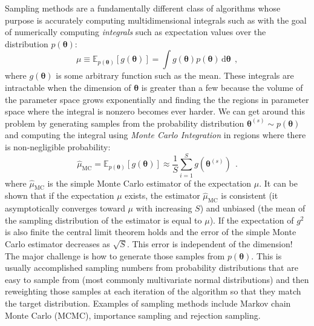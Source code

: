 \documentclass[12pt,dvipsnames]{report}
\newcommand{\ud}{\,\mathrm{d}}
\renewcommand{\vec}[1]{\boldsymbol{\mathbf{#1}}}
\newcommand{\hquad}{~~}
\begin{document}
Sampling methods are a fundamentally different class of algorithms whose
purpose is accurately computing multidimensional integrals such as with the
goal of numerically computing \emph{integrals} such as expectation values over
the distribution $p(\vec{\theta})$:
\begin{equation}
    \mu\equiv \mathbb{E}_{p(\vec \theta)}[g(\vec \theta)]=\int g(\vec \theta) p(\vec \theta) \ud \vec \theta\hquad ,
    \label{eq:general_expectation}
\end{equation}
where $g(\vec \theta)$ is some arbitrary function such as the mean.
These integrals are intractable when the dimension of $\vec{\theta}$ is greater than
a few because  the volume of the parameter space grows exponentially and finding
the the regions in parameter space where the integral is nonzero becomes ever harder.
We can get around this problem by generating samples from the probability distribution
$\vec{\theta}^{(s)}\sim p(\vec{\theta})$ and computing the integral using
\textsl{Monte Carlo Integration} in regions where there is non-negligible probability:
\begin{equation}
    \hat{\mu}_\mathrm{MC}=\mathbb{E}_{p(\vec \theta)}[g(\vec \theta)] \approx \frac{1}{S} \sum_{i=1}^{S} g\left(\vec \theta^{(s)}\right)\hquad .
    \label{eq:monte_carlo_estimator}
\end{equation}
where $\hat{\mu}_\mathrm{MC}$ is the simple Monte Carlo estimator of the expectation
$\mu$.
It can be shown that if the expectation $\mu$ exists, the estimator
$\hat{\mu}_\mathrm{MC}$ is consistent (it asymptotically converges toward $\mu$ with
increasing $S$) and unbiased (the mean of the sampling distribution of the estimator
is equal to $\mu$). If the expectation of $g^2$ is also finite the central limit
theorem holds and the error of the simple  Monte Carlo estimator decreases as
$\sqrt{S}$. This error is independent of the dimension!
The major challenge is how to generate those samples from $p(\vec{\theta})$. This
is usually accomplished
sampling numbers from probability distributions that are easy to sample from
(most commonly multivariate normal distributions) and then reweighting those
samples at each iteration of the algorithm so that they match the target
distribution. Examples of sampling methods include Markov chain Monte Carlo
(MCMC), importance sampling and rejection sampling.
\end{document}
